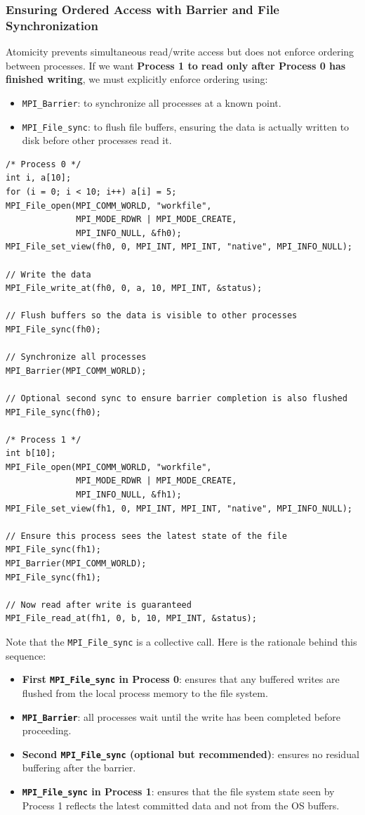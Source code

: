 \documentclass[12pt]{book}
\begin{document}
\subsubsection{Ensuring Ordered Access with Barrier and File Synchronization}

Atomicity prevents simultaneous read/write access but does not enforce ordering between processes.  
If we want \textbf{Process 1 to read only after Process 0 has finished writing}, we must explicitly enforce ordering using:
\begin{itemize}
    \item \texttt{MPI\_Barrier}: to synchronize all processes at a known point.
    \item \texttt{MPI\_File\_sync}: to flush file buffers, ensuring the data is actually written to disk before other processes read it.
\end{itemize}

\begin{lstlisting}[style=cppstyle]
/* Process 0 */
int i, a[10];
for (i = 0; i < 10; i++) a[i] = 5;
MPI_File_open(MPI_COMM_WORLD, "workfile",
              MPI_MODE_RDWR | MPI_MODE_CREATE,
              MPI_INFO_NULL, &fh0);
MPI_File_set_view(fh0, 0, MPI_INT, MPI_INT, "native", MPI_INFO_NULL);

// Write the data
MPI_File_write_at(fh0, 0, a, 10, MPI_INT, &status);

// Flush buffers so the data is visible to other processes
MPI_File_sync(fh0);

// Synchronize all processes
MPI_Barrier(MPI_COMM_WORLD);

// Optional second sync to ensure barrier completion is also flushed
MPI_File_sync(fh0);

/* Process 1 */
int b[10];
MPI_File_open(MPI_COMM_WORLD, "workfile",
              MPI_MODE_RDWR | MPI_MODE_CREATE,
              MPI_INFO_NULL, &fh1);
MPI_File_set_view(fh1, 0, MPI_INT, MPI_INT, "native", MPI_INFO_NULL);

// Ensure this process sees the latest state of the file
MPI_File_sync(fh1);
MPI_Barrier(MPI_COMM_WORLD);
MPI_File_sync(fh1);

// Now read after write is guaranteed
MPI_File_read_at(fh1, 0, b, 10, MPI_INT, &status);
\end{lstlisting}

Note that the \texttt{MPI\_File\_sync} is a collective call. Here is the rationale behind this sequence:
\begin{itemize}
    \item \textbf{First \texttt{MPI\_File\_sync} in Process 0}: ensures that any buffered writes are flushed from the local process memory to the file system.
    \item \textbf{\texttt{MPI\_Barrier}}: all processes wait until the write has been completed before proceeding.
    \item \textbf{Second \texttt{MPI\_File\_sync} (optional but recommended)}: ensures no residual buffering after the barrier.
    \item \textbf{\texttt{MPI\_File\_sync} in Process 1}: ensures that the file system state seen by Process 1 reflects the latest committed data and not from the OS buffers.
\end{itemize}
\end{document}
